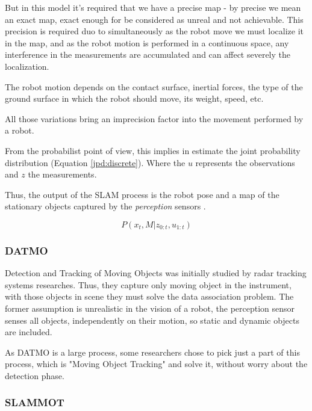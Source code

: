 \documentclass{llncs}
\begin{document}
But in this model it's required that we have a precise map - by precise we mean an exact map, exact enough for be considered as unreal and not achievable. This precision is required duo to simultaneously as the robot move we must localize it in the map, and as the robot motion is performed in a continuous space, any interference in the measurements are accumulated and can affect severely the localization.

The robot motion depends on the contact surface, inertial forces, the type of the ground surface in which the robot should move, its weight, speed, etc.

All those variations bring an imprecision factor into the movement performed by a robot.

From the probabilist point of view, this implies in estimate the joint probability distribution (Equation \ref{jpd:discrete}). Where the $u$ represents the observations and $z$ the measurements.

Thus, the output of the SLAM process is the robot pose and a map of the stationary objects captured by the \textit{perception} sensors \cite{iyengar1991autonomous}.


\begin{equation}
\label{jpd:discrete}
P(x_t,M | z_{0:t}, u_{1:t})
\end{equation}


\subsubsection{DATMO}

Detection and Tracking of Moving Objects was initially studied by radar tracking systems \cite{VU-2009-454238} researches. Thus, they capture only moving object in the instrument, with those objects in scene they must solve the data association problem. The former assumption is unrealistic in the vision of a robot, the perception sensor senses all objects, independently on their motion, so static and dynamic objects are included.

As DATMO is a large process, some researchers chose to pick just a part of this process, which is "Moving Object Tracking" and solve it, without worry about the detection phase.

\subsubsection{SLAMMOT}
\end{document}
